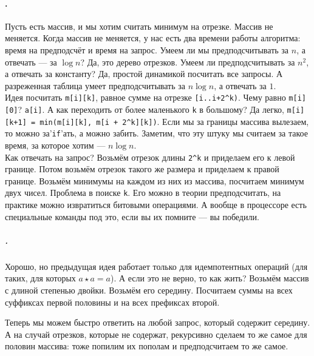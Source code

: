 \documentclass{article}
\newcommand{\pseudo}{PseudoLexer.py:PseudoLexer -x}
\newcommand{\pseudocode}[1]{\texttt{#1}}
\begin{document}
    \paragraph{.}
    Пусть есть массив, и мы хотим считать минимум на отрезке. Массив не меняется. Когда массив не меняется, у нас есть два времени работы алгоритма: время на предподсчёт и время на запрос. Умеем ли мы предподсчитывать за $n$, а отвечать --- за $\log n$? Да, это дерево отрезков. Умеем ли предподсчитывать за $n^2$, а отвечать за константу? Да, простой динамикой посчитать все запросы. А разреженная таблица умеет предподсчитывать за $n\log n$, а отвечать за $1$.\\
    Идея посчитать \pseudocode{m[i][k]}, равное сумме на отрезке \pseudocode{[i..i+2^k)}. Чему равно \pseudocode{m[i][0]}? \pseudocode{a[i]}. А как переходить от более маленького \pseudocode{k} в большому? Да легко, \pseudocode{m[i][k+1] = min(m[i][k], m[i + 2^k][k])}. Если мы за границы массива вылезаем, то можно за'\pseudocode{if}'ать, а можно забить. Заметим, что эту штуку мы считаем за такое время, за которое хотим --- $n\log n$.\\
    Как отвечать на запрос? Возьмём отрезок длины \pseudocode{2^k} и приделаем его к левой границе. Потом возьмём отрезок такого же размера и приделаем к правой границе. Возьмём минимумы на каждом из них из массива, посчитаем минимум двух чисел. Проблема в поиске \pseudocode{k}. Его можно в теории предподсчитать, на практике можно извратиться битовыми операциями. А вообще в процессоре есть специальные команды под это, если вы их помните --- вы победили.\\
    \subparagraph{.}
    Хорошо, но предыдущая идея работает только для идемпотентных операций (для таких, для которых $a\star a=a$). А если это не верно, то как жить? Возьмём массив с длиной степенью двойки. Возьмём его середину. Посчитаем суммы на всех суффиксах первой половины и на всех префиксах второй.
    \begin{center}
    \end{center}
    Теперь мы можем быстро ответить на любой запрос, который содержит середину. А на случай отрезков, которые не содержат, рекурсивно сделаем то же самое для половин массива: тоже попилим их пополам и предподсчитаем то же самое.
\end{document}
